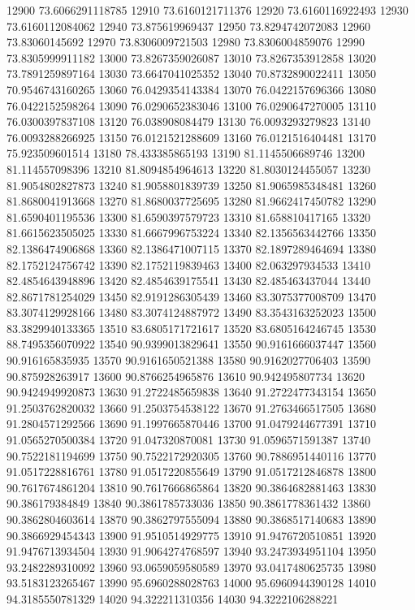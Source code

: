 {12900 73.6066291118785
12910 73.6160121711376
12920 73.6160116922493
12930 73.6160112084062
12940 73.875619969437
12950 73.8294742072083
12960 73.83060145692
12970 73.8306009721503
12980 73.8306004859076
12990 73.8305999911182
13000 73.8267359026087
13010 73.8267353912858
13020 73.7891259897164
13030 73.6647041025352
13040 70.8732890022411
13050 70.9546743160265
13060 76.0429354143384
13070 76.0422157696366
13080 76.0422152598264
13090 76.0290652383046
13100 76.0290647270005
13110 76.0300397837108
13120 76.038908084479
13130 76.0093293279823
13140 76.0093288266925
13150 76.0121521288609
13160 76.0121516404481
13170 75.923509601514
13180 78.433385865193
13190 81.1145506689746
13200 81.114557098396
13210 81.8094854964613
13220 81.8030124455057
13230 81.9054802827873
13240 81.9058801839739
13250 81.9065985348481
13260 81.8680041913668
13270 81.8680037725695
13280 81.9662417450782
13290 81.6590401195536
13300 81.6590397579723
13310 81.658810417165
13320 81.6615623505025
13330 81.6667996753224
13340 82.1356563442766
13350 82.1386474906868
13360 82.1386471007115
13370 82.1897289464694
13380 82.1752124756742
13390 82.1752119839463
13400 82.063297934533
13410 82.4854643948896
13420 82.4854639175541
13430 82.485463437044
13440 82.8671781254029
13450 82.9191286305439
13460 83.3075377008709
13470 83.3074129928166
13480 83.3074124887972
13490 83.3543163252023
13500 83.3829940133365
13510 83.6805171721617
13520 83.6805164246745
13530 88.7495356070922
13540 90.9399013829641
13550 90.9161666037447
13560 90.916165835935
13570 90.9161650521388
13580 90.9162027706403
13590 90.875928263917
13600 90.8766254965876
13610 90.942495807734
13620 90.9424949920873
13630 91.2722485659838
13640 91.2722477343154
13650 91.2503762820032
13660 91.2503754538122
13670 91.2763466517505
13680 91.2804571292566
13690 91.1997665870446
13700 91.0479244677391
13710 91.0565270500384
13720 91.047320870081
13730 91.0596571591387
13740 90.7522181194699
13750 90.7522172920305
13760 90.7886951440116
13770 91.0517228816761
13780 91.0517220855649
13790 91.0517212846878
13800 90.7617674861204
13810 90.7617666865864
13820 90.3864682881463
13830 90.386179384849
13840 90.3861785733036
13850 90.3861778361432
13860 90.3862804603614
13870 90.3862797555094
13880 90.3868517140683
13890 90.3866929454343
13900 91.9510514929775
13910 91.9476720510851
13920 91.9476713934504
13930 91.9064274768597
13940 93.2473934951104
13950 93.2482289310092
13960 93.0659059580589
13970 93.0417480625735
13980 93.5183123265467
13990 95.6960288028763
14000 95.6960944390128
14010 94.3185550781329
14020 94.322211310356
14030 94.3222106288221
}
